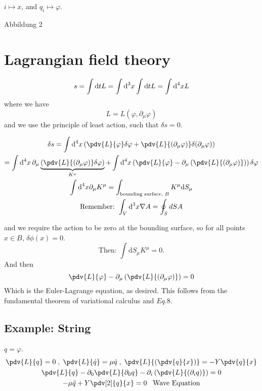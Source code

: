 \documentclass[]{scrartcl}
\begin{document}
$i \mapsto x$, and $q_i \mapsto \varphi$.

Abbildung 2

\section{Lagrangian field theory}
\begin{equation}
s = \int \text d t L = \int \text{d}^3 x \int \text{d}t L = \int \text{d}^4x L
\end{equation}
where we have
\begin{equation}
	L = L(\varphi, \partial_\mu \varphi)
\end{equation}
and we use the principle of least action, such that $\delta s = 0$.

\begin{gather}
\delta s = \int \text{d}^4x \left(\pdv{L}{\varphi}\delta\varphi + \pdv{L}{(\partial_\mu \varphi)}\delta(\partial_\mu \varphi)\right)\\
= \int\text{d}^4x\,\partial_\mu\underbrace{\left(\pdv{L}{(\partial_\mu \varphi)}\delta\varphi\right)}_{K^\mu} + \int\text{d}^4x\left(\pdv{L}{\varphi} - \partial_\mu\left(\pdv{L}{(\partial_\mu \varphi)}\right)\right)\delta\varphi\\
\int\text{d}^4x \partial_\mu K^\mu = \int_{\text{bounding surface, }B} K^\mu \text{d}S_\mu\\
\text{Remember: }\int_V\text{d}^3x \nabla A = \oint_S dS A
\end{gather}

and we require the action to be zero at the bounding surface, so for all points $x\in B$, $\delta\phi(x) = 0$.
\begin{equation}
	\text{Then: }\int \text{d}S_\mu K^\mu = 0.
\end{equation}
And then
\begin{equation}
	\pdv{L}{\varphi} - \partial_\mu\left(\pdv{L}{(\partial_\mu\varphi)}\right) = 0
\end{equation}
Which is the Euler-Lagrange equation, as desired. This follows from the fundamental theorem of variational calculus and $Eq.8$.

\subsection{Example: String}
$q = \varphi$.
\begin{gather}
	\pdv{L}{q}= 0\;,\;\pdv{L}{\dot{q}} = \mu\dot{q}\;,\;\pdv{L}{(\pdv{q}{x})} = -Y\pdv{q}{x}\\
	\pdv{L}{q} - \partial_0 \pdv{L}{\partial_0 q} - \partial_i\left(\pdv{L}{(\partial_i q)}\right) = 0\\
	-\mu\ddot{q} + Y \pdv[2]{q}{x} = 0\;\;\;\text{Wave Equation}
\end{gather}
\end{document}
